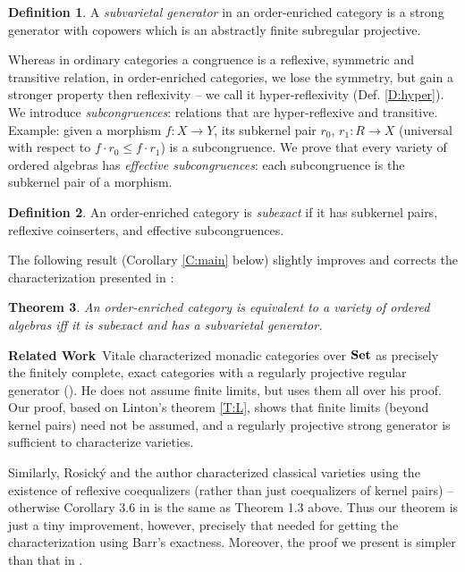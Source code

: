 \documentclass[12pt,amstex,leqno]{amsart}
\newcommand\Set{\operatorname{\bf Set}}
\newtheorem{theorem}{Theorem}[section]
\theoremstyle{definition}
\newtheorem{defi}[theorem]{Definition}
\numberwithin{equation}{section}
\begin{document}
	\begin{defi}\label{de1.4}
		A \emph{subvarietal generator} in an order-enriched category is a strong generator with  copowers which is an abstractly finite subregular projective.
	\end{defi}
	
	Whereas in ordinary categories a congruence is a reflexive, symmetric and transitive relation, in order-enriched categories, we 
	lose the symmetry, but gain a stronger property then reflexivity -- we call it hyper-reflexivity (Def. \ref{D:hyper}). We
	introduce \emph{subcongruences}: relations that are hyper-reflexive and transitive.
	Example: given a morphism $f\colon X \to Y$, its subkernel pair $r_0$, $r_1 \colon R\to X$ (universal with respect to $f\cdot r_0 \leq f\cdot r_1$) is a subcongruence. We prove that every variety of ordered algebras has \emph{effective subcongruences}: each subcongruence is the subkernel pair of a morphism.
	
	\begin{defi}\label{de1.5}
		An order-enriched category is \emph{subexact} if it has subkernel pairs, reflexive coinserters, and effective subcongruences.
		
	\end{defi}
	
	The following result (Corollary \ref{C:main} below) slightly improves and corrects the characterization presented in \cite{ARO}:
	
	\begin{theorem}\label{th1.6}
		An order-enriched category is equivalent to a variety of ordered algebras iff it is subexact and has a subvarietal generator.
	\end{theorem}
	
	\vskip 2mm
	\noindent\textbf{Related Work}\
	Vitale characterized monadic categories over $\Set$ as precisely the finitely complete, exact categories with a regularly projective regular  generator (\cite[Prop. 3.2]{V}). He does not assume finite limits, but uses them all over his proof.
	Our proof, based on Linton's theorem \ref{T:L}, shows that finite limits (beyond kernel pairs) need not be assumed, and a regularly projective strong   generator is sufficient to characterize varieties.

	Similarly, Rosick{\'{y}} and the author characterized classical varieties using the existence of reflexive coequalizers (rather  than just coequalizers of kernel pairs) -- otherwise Corollary 3.6 in \cite{ARV} is the same as Theorem 1.3 above. Thus our theorem is just a tiny improvement, however, precisely that needed for getting the characterization using Barr's exactness. Moreover, the proof we present is simpler than that in \cite{ARV}.
	
\end{document}
